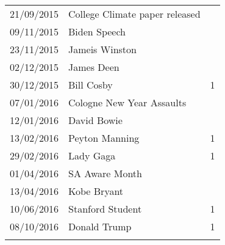{\begin{tabular}{llr}
21/09/2015 & College Climate paper released        &            \\
09/11/2015 & Biden Speech                            &            \\
23/11/2015 & Jameis Winston                 &            \\
02/12/2015 & James Deen                            &            \\
30/12/2015 & Bill Cosby                      & 1          \\
07/01/2016 & Cologne New Year Assaults             &            \\
12/01/2016 & David Bowie                           &            \\
13/02/2016 & Peyton Manning                        & 1          \\
29/02/2016 & Lady Gaga                             & 1          \\
01/04/2016 & SA Aware Month                        &            \\
13/04/2016 & Kobe Bryant                           &            \\
10/06/2016 & Stanford Student                      & 1          \\
08/10/2016 & Donald Trump                    & 1          \\
\hline\hline \\
\end{tabular}
}